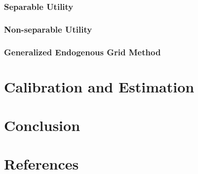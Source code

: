\documentclass{article}
\begin{document}
\subsubsection{Separable Utility}\label{Separable Utility}

\subsubsection{Non-separable Utility}\label{Non-separable Utility}

\subsubsection{Generalized Endogenous Grid Method}\label{Generalized Endogenous Grid Method}

\section{Calibration and Estimation}\label{Calibration and Estimation}

\section{Conclusion}\label{Conclusion}

\section{References}\label{References}

\cite{Carroll_2000}
\cite{Carroll_1998}
\cite{Michaillat_2021}
\cite{Auclert_2021}
\cite{Mian_2020}
\cite{Kaplan_2018}
\cite{Auclert_2020}





\end{document}
